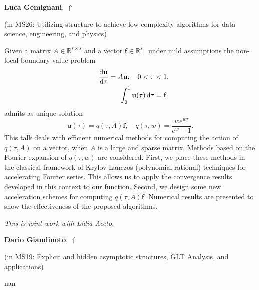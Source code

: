 \documentclass[ILAS2025-program.tex]{subfiles}
\begin{document}
     \hypertarget{down0026}{}\begin{ilasabstract}
    
    \textbf{Luca Gemignani},  \hfill \hyperlink{up0026}{$\Uparrow$}
    
    (in {\color{mstitle}MS26: Utilizing structure to achieve low-complexity algorithms for data science, engineering, and physics})
        
        \mtskip
    Given a matrix $A\in \mathbb R^{s\times s}$ and a  vector $\mathbf {f} \in \mathbb{ R } ^s,$ under mild assumptions the non-local boundary value problem 
\begin{eqnarray*}
    &&\odv{\mathbf{u}}{\tau} = A \mathbf{u}, \quad 0<\tau<1,   \label{l1} \\
  &&\displaystyle \int_0^1 \mathbf{u}(\tau) \,\mathrm{d}\tau = \mathbf {f}, \label{l2}
\end{eqnarray*}
admits as unique solution
\[
 \mathbf{u}(\tau)= q(\tau,A) \mathbf {f}, \quad q(\tau,w)= \frac{w e^{w\tau}}{e^w -1}.
 \]
This talk  deals with efficient numerical methods for computing the action
of $q(\tau,A)$ on a vector,  when $A$ is a large and
  sparse matrix.  Methods based on the Fourier expansion of $q(\tau,w)$
are considered. First, we place
these methods in the classical framework of Krylov-Lanczos
(polynomial-rational) techniques for accelerating Fourier series.
This allows us to apply the convergence results developed in this
context to our function. Second, we design some  new acceleration schemes for computing $q(\tau,A) \mathbf {f}$. Numerical results are presented to show the effectiveness of
the proposed algorithms.


\emph{This is joint work with Lidia Aceto.}\end{ilasabstract}
     \hypertarget{down0256}{}\begin{ilasabstract}
    
    \textbf{Dario Giandinoto},  \hfill \hyperlink{up0256}{$\Uparrow$}
    
    (in {\color{mstitle}MS19: Explicit and hidden asymptotic structures, GLT Analysis, and applications})
        
        \mtskip
    nan\end{ilasabstract}
\end{document}
